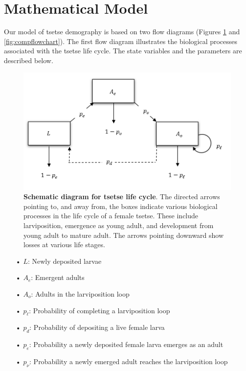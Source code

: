 \documentclass[smallextended]{svjour3}
\begin{document}
	\section{Mathematical Model}
	\label{model}
	Our model of tsetse demography is based on two flow diagrams (Figures \ref{fig:bioflowchart} and \ref{fig:compflowchart}). The first flow diagram illustrates the biological processes associated with the tsetse life cycle. The state variables and the parameters are described below.   
	
	\begin{figure}[hbt!]
		\centering
		\includegraphics[width=0.7\linewidth]{Bioflowchart.png}
		\caption{\textbf{Schematic diagram for tsetse life cycle}. The directed arrows pointing to, and away from, the boxes indicate various biological processes in the life cycle of a female tsetse. These include larviposition, emergence as young adult, and development from young adult to mature adult. The arrows pointing downward show losses at various life stages.}
		\label{fig:bioflowchart}
	\end{figure}
	
	\begin{itemize}
		\item[•] $L$: Newly deposited larvae
		\item[•] $A_{e}$: Emergent adults
		\item[•] $A_{o}$: Adults in the larviposition loop
		\item[•] $p_{\ell}$: Probability of completing a larviposition loop 
		\item[•] $p_d$: Probability of depositing a live female larva 
		\item[•] $p_e$: Probability a newly deposited female larva emerges as an adult 
		\item[•] $p_{\nu}$: Probability a newly emerged adult reaches the larviposition loop 
	\end{itemize}
	
\end{document}

